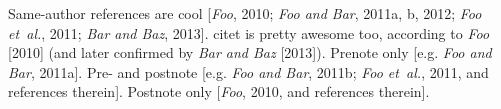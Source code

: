 \documentclass{article}
\begin{document}
Same-author references are cool [\textit{Foo}, 2010; \textit{Foo and Bar}, 2011a, b, 2012; \textit{Foo et~al.}, 2011; \textit{Bar and Baz}, 2013].
citet is pretty awesome too, according to \textit{Foo} [2010] (and later confirmed by \textit{Bar and Baz} [2013]).
Prenote only [e.g. \textit{Foo and Bar}, 2011a].
Pre- and postnote [e.g. \textit{Foo and Bar}, 2011b; \textit{Foo et~al.}, 2011, and references therein].
Postnote only [\textit{Foo}, 2010, and references therein].

\nocite{foo2010,foo2011lorem,foo2011ipsum,foo2012,foo2011dolor,bar2013}
\end{document}
